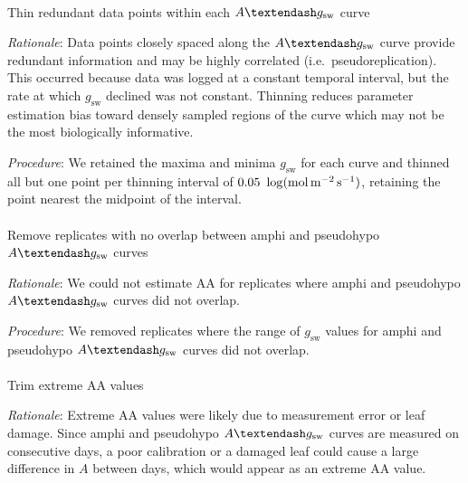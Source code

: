 \documentclass[
  letterpaper,
  DIV=11,
  numbers=noendperiod]{scrartcl}
\makeatletter
\let\oldparagraph\paragraph
\renewcommand{\paragraph}{
    \@ifstar
      \xxxParagraphStar
      \xxxParagraphNoStar
  }
\newcommand{\xxxParagraphStar}[1]{\oldparagraph*{#1}\mbox{}}
\newcommand{\xxxParagraphNoStar}[1]{\oldparagraph{#1}\mbox{}}
\newcommand{\aax}{$\mathrm{AA}$}
\newcommand{\agcurve}{$A \textendash g_\text{sw}$}
\newcommand{\gsw}{$g_\text{sw}$}
\makeatother
\begin{document}
\paragraph{\texorpdfstring{Thin redundant data points within each
\agcurve{}
curve}{Thin redundant data points within each  curve}}\label{thin-redundant-data-points-within-each-curve}

\emph{Rationale}: Data points closely spaced along the \agcurve{} curve
provide redundant information and may be highly correlated
(i.e.~pseudoreplication). This occurred because data was logged at a
constant temporal interval, but the rate at which \gsw{} declined was
not constant. Thinning reduces parameter estimation bias toward densely
sampled regions of the curve which may not be the most biologically
informative.

\emph{Procedure}: We retained the maxima and minima \gsw{} for each
curve and thinned all but one point per thinning interval of
\(0.05~\log(\si{\mol\raiseto{-2}\meter\raiseto{-1}\second})\), retaining
the point nearest the midpoint of the interval.

\paragraph{\texorpdfstring{Remove replicates with no overlap between
amphi and pseudohypo \agcurve{}
curves}{Remove replicates with no overlap between amphi and pseudohypo  curves}}\label{remove-replicates-with-no-overlap-between-amphi-and-pseudohypo-curves}

\emph{Rationale}: We could not estimate \aax{} for replicates where
amphi and pseudohypo \agcurve{} curves did not overlap.

\emph{Procedure}: We removed replicates where the range of \gsw{} values
for amphi and pseudohypo \agcurve{} curves did not overlap.

\paragraph{\texorpdfstring{Trim extreme \aax{}
values}{Trim extreme  values}}\label{trim-extreme-values}

\emph{Rationale}: Extreme \aax{} values were likely due to measurement
error or leaf damage. Since amphi and pseudohypo \agcurve{} curves are
measured on consecutive days, a poor calibration or a damaged leaf could
cause a large difference in \(A\) between days, which would appear as an
extreme \aax{} value.
\end{document}
